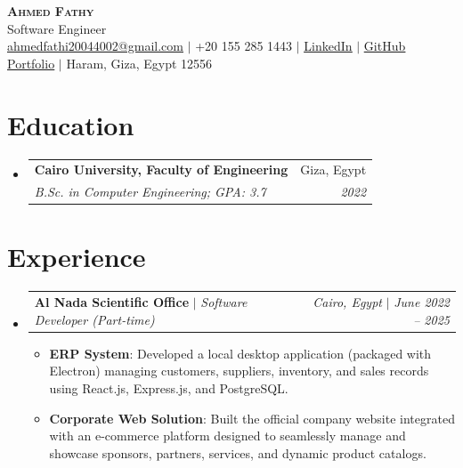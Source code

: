 \documentclass[letterpaper,11pt]{article}
\makeatletter
\newcommand{\resumeItem}[2]{\item\small{\textbf{#1}{: #2 \vspace{0pt}}}}
\newcommand{\resumeSubheading}[4]{
  \vspace{0pt}\item
    \begin{tabular*}{0.95\textwidth}{l@{\extracolsep{\fill}}r}
      \textbf{#1} & #2 \\
      \textit{\small#3} & \textit{\small #4} \\
    \end{tabular*}\vspace{0pt}
}
\newcommand{\resumeActivitySubheading}[4]{
  \vspace{0pt}\item
    \begin{tabular*}{0.95\textwidth}{l@{\extracolsep{\fill}}r}
      \textbf{#1} $|$ \textit{\small#3} & \textit{\small#2} $|$ \textit{\small #4} \\
    \end{tabular*}\vspace{0pt}
}
\newcommand{\resumeSubHeadingListStart}{\begin{itemize}[leftmargin=*]}
\newcommand{\resumeSubHeadingListEnd}{\end{itemize}}
\newcommand{\resumeItemListStart}{\begin{itemize}}
\newcommand{\resumeItemListEnd}{\end{itemize}\vspace{0pt}}
\newcommand{\resumeHeaderName}[1]{\LARGE \scshape #1}
\newcommand{\resumeHeaderMeta}[1]{\small #1}
\makeatother
\begin{document}
\begin{center}
    \textbf{\resumeHeaderName{Ahmed Fathy}} \\ \vspace{2pt}
    \resumeHeaderMeta{Software Engineer} \\
    \href{mailto:ahmedfathi20044002@gmail.com}{\underline{ahmedfathi20044002@gmail.com}} $|$
    +20 155 285 1443 $|$
    \href{https://www.linkedin.com/in/ahmedfathy-x1}{\underline{LinkedIn}} $|$
    \href{https://github.com/ahmedfathy0-0}{\underline{GitHub}} \\
    \href{https://www.mrfathi.tech/}{\underline{Portfolio}} $|$
    Haram, Giza, Egypt 12556
\end{center}


\section{Education}
  \resumeSubHeadingListStart
    \resumeSubheading
      {Cairo University, Faculty of Engineering}{Giza, Egypt}
      {B.Sc. in Computer Engineering;  GPA: 3.7}{2022}
  \resumeSubHeadingListEnd
\section{Experience}
  \resumeSubHeadingListStart
    \resumeActivitySubheading
      {Al Nada Scientific Office}{Cairo, Egypt}{Software Developer (Part-time)}{June 2022 -- 2025}
      \resumeItemListStart
        \resumeItem{ERP System}
          {Developed a local desktop application (packaged with Electron) managing customers, suppliers, inventory, and sales records using React.js, Express.js, and PostgreSQL.}
        \resumeItem{Corporate Web Solution}
          {Built the official company website integrated with an e-commerce platform designed to seamlessly manage and showcase sponsors, partners, services, and dynamic product catalogs.}
      \resumeItemListEnd
  \resumeSubHeadingListEnd
\end{document}
